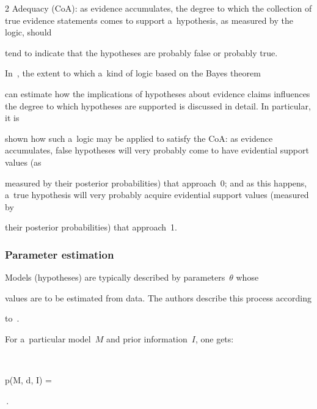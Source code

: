 \begin{multicols}{2}
Adequacy (CoA): as evidence accumulates, the degree to which the collection of true evidence statements comes to support a~hypothesis, as measured by the logic, should


tend to indicate that the hypotheses are probably false or probably true.


  In~\cite{35-kl}, the extent to which a~kind of logic based on the Bayes theorem


can estimate how the implications of hypotheses about evidence claims influences the degree to which hypotheses are supported is discussed in detail. In particular, it is


shown how such a~logic may be applied to satisfy the CoA: as evidence accumulates, false hypotheses will very probably come to have evidential support values (as


measured by their posterior probabilities) that approach~0; and as this happens, a~true hypothesis will very probably acquire evidential support values (measured by


their posterior probabilities) that approach~1.





\vspace*{-8pt}





\subsubsection{Parameter estimation }










  \noindent


  Models (hypotheses) are typically described by parameters~$\theta$  whose


  values are to be estimated from data. The authors describe this process according


  to~\cite{27-kl}.


For a~particular model~$M$ and prior information~$I$, one gets:


  $$


  p(M, \theta\vert d, I) =


  \,.



\end{multicols}
